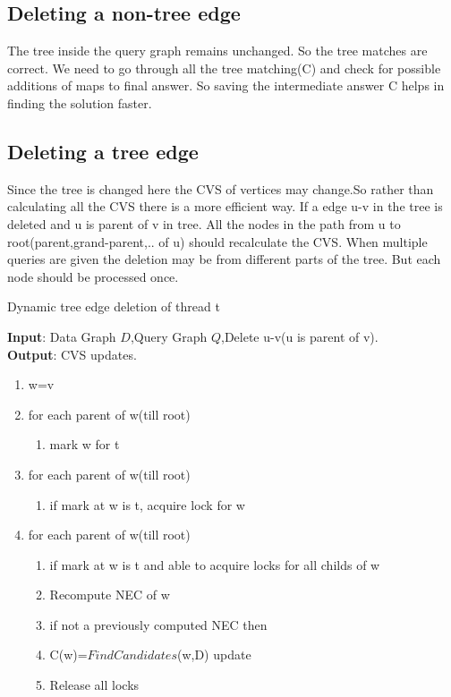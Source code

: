 \subsection{Deleting a non-tree edge}	
	\hspace{10mm} The tree inside the query graph remains unchanged. So the tree matches are correct. We need to go through all the tree matching(C) and check for possible additions of maps to final answer. So saving the intermediate answer C helps in finding the solution faster.
\subsection{Deleting a tree edge}	
	\hspace{10mm} Since the tree is changed here the CVS of vertices may change.So rather than calculating all the CVS there is a more efficient way. If a edge u-v in the tree is deleted and u is parent of v in tree. All the nodes in the path from u to root(parent,grand-parent,.. of u) should recalculate the CVS.
	 \hspace{10mm} When multiple queries are given the deletion may be from different parts of the tree. But each node should be processed once. 
\begin{algorithm}[H]
\caption{Dynamic tree edge deletion of thread t}
\textbf{Input}: Data Graph $D$,Query Graph $Q$,Delete u-v(u is parent of v).\\
\textbf{Output}: CVS updates.\\
\begin{algorithmic}
 \item \begin{enumerate}
 \item w=v
\item for each parent of w(till root)
 \begin{enumerate}
\item mark w for t
\end{enumerate}
\item for each parent of w(till root)
 \begin{enumerate}
\item if mark at w is t, acquire lock for w
\end{enumerate}
\item for each parent of w(till root)
\begin{enumerate}
\item if mark at w is t and able to acquire locks for all childs of w 
\item Recompute NEC of w
\item if not a previously computed NEC then
\item  \hspace{10mm}C(w)=$FindCandidates$(w,D) update
\item Release all locks
\end{enumerate}
\end{enumerate}
\end{algorithmic}
\end{algorithm}
